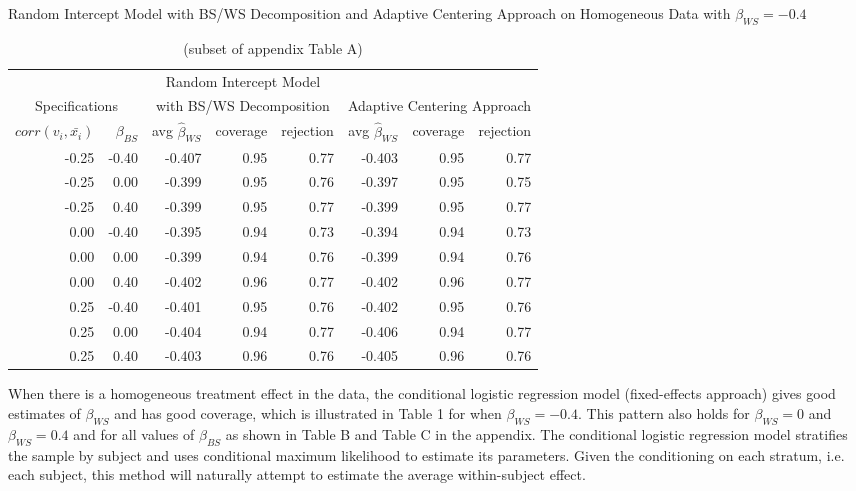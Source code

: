 \documentclass{article}
\begin{document}
      \begin{table}[ht]
        \centering
        \caption{Random Intercept Model with BS/WS Decomposition and Adaptive Centering Approach on Homogeneous Data with $\beta_{WS} = -0.4$}
            \begin{tabular}{|r r || r r r | r r r| } %
                \hline
                \multicolumn{2}{|c||}{} & \multicolumn{3}{c|}{Random Intercept Model} & \multicolumn{3}{c|}{}\\ 
                \multicolumn{2}{|c||}{Specifications} & \multicolumn{3}{c|}{with BS/WS Decomposition} & \multicolumn{3}{c|}{Adaptive Centering Approach} \\
                \hline
                $corr(v_i,\bar{x_i})$ & $\beta_{BS}$ & avg $\hat{\beta}_{WS}$ & coverage & rejection & avg $\hat{\beta}_{WS}$ & coverage & rejection \\
                \hline 
                -0.25	&-0.40	&-0.407 &0.95 &0.77 &-0.403 &0.95 &0.77 \\
                -0.25	&0.00	&-0.399 &0.95 &0.76 &-0.397 &0.95 &0.75 \\
                -0.25	&0.40	&-0.399 &0.95 &0.77 &-0.399 &0.95 &0.77 \\
                0.00	&-0.40	&-0.395 &0.94 &0.73 &-0.394 &0.94 &0.73 \\
                0.00	&0.00	&-0.399 &0.94 &0.76 &-0.399 &0.94 &0.76 \\
                0.00	&0.40	&-0.402 &0.96 &0.77 &-0.402 &0.96 &0.77 \\
                0.25	&-0.40	&-0.401 &0.95 &0.76 &-0.402 &0.95 &0.76 \\
                0.25	&0.00	&-0.404 &0.94 &0.77 &-0.406 &0.94 &0.77 \\
                0.25    &0.40   &-0.403 &0.96 &0.76 &-0.405 &0.96 &0.76 \\
                \hline 
            \end{tabular}
        \caption*{(subset of appendix Table A)}
    \end{table} 

        When there is a homogeneous treatment effect in the data, the conditional logistic regression model (fixed-effects approach) gives good estimates of $\beta_{WS}$ and has good coverage, which is illustrated in Table 1 for when $\beta_{WS} = -0.4$. This pattern also holds for $\beta_{WS} = 0$ and $\beta_{WS} = 0.4$ and for all values of $\beta_{BS}$ as shown in Table B and Table C in the appendix. The conditional logistic regression model stratifies the sample by subject and uses conditional maximum likelihood to estimate its parameters. Given the conditioning on each stratum, i.e. each subject, this method will naturally attempt to estimate the average within-subject effect. 
        
\end{document}
